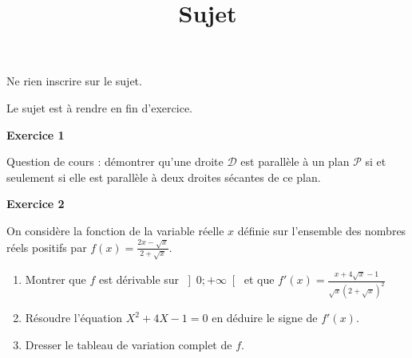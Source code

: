 \documentclass[12pt,a4paper,french]{article}
\author{}
\title{Sujet \no{10}}
\date{}
\begin{document}
\maketitle
\begin{center}Ne rien inscrire sur le sujet.

  Le sujet est à rendre en fin d'exercice.
\end{center}

\bigskip

\textbf{Exercice 1}

Question de cours : démontrer qu'une droite $\mathcal{D}$ est
parallèle à un plan $\mathcal{P}$ si et seulement si elle est parallèle
à deux droites sécantes de ce plan.

\medskip

\textbf{Exercice 2}

On considère la fonction de la variable réelle $x$ définie sur
l'ensemble des nombres réels positifs par $f(x) = \frac{2x - \sqrt{x}}{2
+ \sqrt{x}}$.

\begin{enumerate}
  \item Montrer que $f$ est dérivable sur $\left]0 ; +\infty\right[$ et
    que $f'(x) = \frac{ x + 4\sqrt{x} - 1}{\sqrt{x}(2 + \sqrt{x})^2}$
  \item Résoudre l'équation $X^2 + 4X - 1 =0$ en déduire le signe de
    $f'(x)$.
  \item Dresser le tableau de variation complet de $f$.
\end{enumerate}
\end{document}
